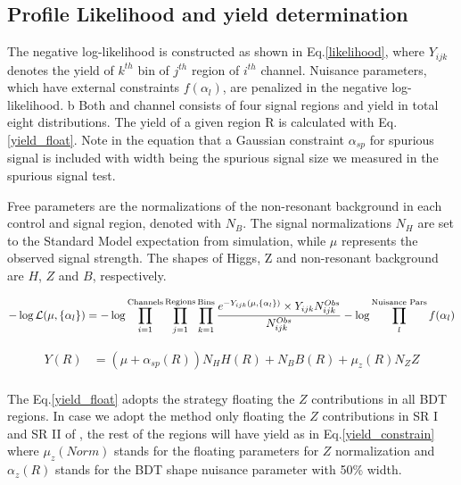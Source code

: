 %


\subsection{Profile Likelihood and yield determination}

The negative log-likelihood is constructed as shown in Eq.\ref{likelihood}, 
where $Y_{ijk}$ denotes the yield of $k^{th}$ bin of $j^{th}$ region of $i^{th}$ channel. 
Nuisance parameters, which have external constraints $f(\alpha_l)$, are penalized in the negative log-likelihood. 
b
Both \twocentral{} and  \fourcentral{} channel consists of four signal regions and yield in total eight \Mbb{} distributions.
The yield of a given region R is calculated with Eq.\ref{yield_float}. Note in the equation that a Gaussian constraint $\alpha_{sp}$ 
for spurious signal is included with width being the spurious signal size we measured in the spurious signal test.

Free parameters are the normalizations of the non-resonant background in each control and
signal region, denoted with $N_B$.
The signal normalizations $N_H$ are set to the Standard Model expectation from simulation,
while $\mu$ represents the observed signal strength.
The shapes of Higgs, Z and non-resonant background are $H$, $Z$ and $B$, respectively.

\begin{equation}
\label{likelihood}
-\log\mathcal{L}(\mu, \{\alpha_{l}\} )= -\log \prod_{i=1}^{\textnormal{Channels}} \prod_{j=1}^{\textnormal{Regions}} \prod_{k=1}^{\textnormal{Bins}} \frac{e^{-Y_{ijk}(\mu, \{\alpha_l\})} \times Y_{ijk}N_{ijk}^{Obs} }{N_{ijk}^{Obs}} - \log \prod_{l}^{\textnormal{Nuisance Pars}} f(\alpha_l)
\end{equation}

\begin{equation}
\label{yield_float}
\begin{split}
Y(R) &= (\mu + \alpha_{sp}(R))N_{H}H(R)+ N_{B}B(R)+ \mu_{z}(R)N_{Z}Z  \\
\end{split}
\end{equation}


The Eq.\ref{yield_float} adopts the strategy floating the $Z$ contributions in all BDT regions. In case we adopt the method only floating the $Z$ contributions in SR I and SR II of \twocentral, the rest of the regions will have yield as in Eq.\ref{yield_constrain} where $\mu_z(Norm)$ stands for the floating parameters for $Z$ normalization and $\alpha_z(R)$ stands for the BDT shape nuisance parameter with 50\% width. 

